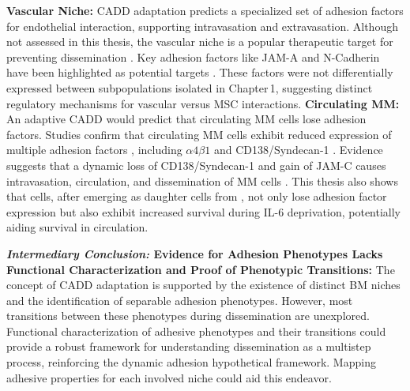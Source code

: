 \textbf{Vascular Niche:}
\ac{CADD} adaptation predicts a specialized set of adhesion factors for
endothelial interaction, supporting intravasation and extravasation. Although
not assessed in this thesis, the vascular niche is a popular therapeutic target
for preventing dissemination \cite{neriTargetingAdhesionMolecules2012}. Key
adhesion factors like JAM-A and N-Cadherin have been highlighted as potential
targets \cite{solimandoHaltingViciousCycle2020,
      mrozikTherapeuticTargetingNcadherin2015}. These factors were not differentially
expressed between subpopulations isolated in Chapter\,1, suggesting distinct
regulatory mechanisms for vascular versus \ac{MSC} interactions.
\textbf{Circulating MM:}
An adaptive \ac{CADD} would predict that circulating MM cells lose adhesion
factors. Studies confirm that  circulating
\ac{MM} cells exhibit reduced expression of multiple adhesion factors
, including
$\alpha4\beta1$ and CD138/Syndecan-1
\cite{paivaDetailedCharacterizationMultiple2013,
      paivaCompetitionClonalPlasma2011, akhmetzyanovaDynamicCD138Surface2020}.
Evidence suggests that a dynamic loss of CD138/Syndecan-1 and gain of JAM-C
causes intravasation, circulation, and dissemination of MM cells
\cite{akhmetzyanovaDynamicCD138Surface2020,
      brandlJunctionalAdhesionMolecule2022}. This thesis also shows that \nMAina
cells, after emerging as daughter cells from \MAina, not only lose adhesion
factor expression but also exhibit increased survival during IL-6 deprivation,
potentially aiding survival in circulation.


\textbf{\textit{Intermediary Conclusion:} Evidence for Adhesion Phenotypes Lacks Functional Characterization and Proof of Phenotypic Transitions:}
The concept of \ac{CADD} adaptation is supported by the existence of distinct BM
niches and the identification of separable adhesion phenotypes. However, most
transitions between these phenotypes during dissemination are unexplored.
Functional characterization of adhesive phenotypes and their transitions could
provide a robust framework for understanding dissemination as a multistep
process, reinforcing the dynamic adhesion hypothetical framework. Mapping
adhesive properties for each involved niche could aid this endeavor.



